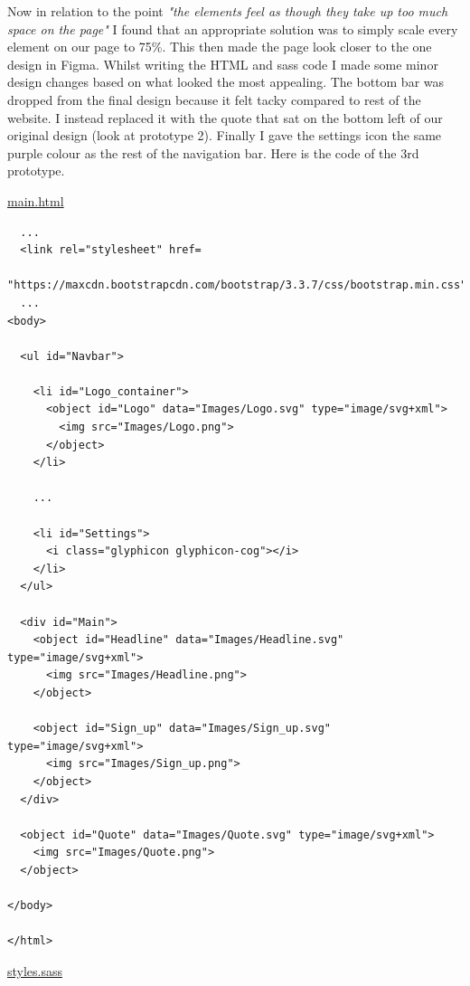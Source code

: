 Now in relation to the point \textit{"the elements feel as
though they take up too much space on the page"} I found that 
an appropriate solution was to simply scale every element on 
our page to 75\%. This then made the page look closer to the
one design in Figma. Whilst writing the HTML and sass code I
made some minor design changes based on what looked the most
appealing. The bottom bar was dropped from the final design
because it felt tacky compared to rest of the website. I 
instead replaced it with the quote that sat on the bottom 
left of our original design (look at prototype 2). Finally I 
gave the settings icon the same purple colour as the rest of
the navigation bar. Here is the code of the 3rd prototype. \\
\vspace{0.2cm}

\underline{main.html}

\begin{verbatim}
  ... 
  <link rel="stylesheet" href=
    "https://maxcdn.bootstrapcdn.com/bootstrap/3.3.7/css/bootstrap.min.css">
  ...
<body>
   
  <ul id="Navbar">

    <li id="Logo_container">
      <object id="Logo" data="Images/Logo.svg" type="image/svg+xml">
        <img src="Images/Logo.png">
      </object>
    </li>

    ... 

    <li id="Settings">
      <i class="glyphicon glyphicon-cog"></i>
    </li>
  </ul>

  <div id="Main">
    <object id="Headline" data="Images/Headline.svg" type="image/svg+xml">
      <img src="Images/Headline.png">
    </object>

    <object id="Sign_up" data="Images/Sign_up.svg" type="image/svg+xml">
      <img src="Images/Sign_up.png">
    </object>
  </div>

  <object id="Quote" data="Images/Quote.svg" type="image/svg+xml">
    <img src="Images/Quote.png">
  </object>

</body>

</html>
\end{verbatim}

\underline{styles.sass}

